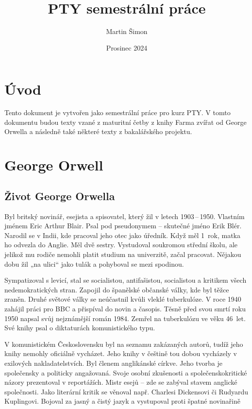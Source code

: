 \documentclass{article}
\title{PTY semestrální práce}
\author{Martin Šimon}
\date{Prosinec 2024}
\begin{document}
\maketitle


\tableofcontents
{} %
\setcounter{page}{2}

\clearpage

\section{Úvod}
Tento dokument je vytvořen jako semestrální práce pro kurz PTY. V tomto dokumentu budou texty vzané z 
maturitní četby z knihy Farma zvířat od George Orwella a následně také některé texty z bakalářského projektu.

\section{George Orwell}

\subsection{Život George Orwella}

Byl britský novinář, esejista a spisovatel, který žil v letech 1903\,--\,1950. Vlastním jménem Eric Arthur Blair. Psal pod pseudonymem – skutečné jméno Erik Blér. Narodil se v Indii, kde pracoval jeho otec jako úředník. Když měl 1~rok, matka ho odvezla do Anglie. Měl dvě sestry. Vystudoval soukromou střední školu, ale jelikož mu rodiče nemohli platit studium na univerzitě, začal pracovat. Nějakou dobu žil „na ulici“ jako tulák a pohyboval se mezi spodinou. 

Sympatizoval s levicí, stal se socialistou, antifašistou, socialistou a kritikem všech nedemokratických stran. 
Zapojil do španělské občanské války, kde byl těžce zraněn. Druhé světové války se neúčastnil kvůli vleklé 
tuberkulóze. V roce 1940 zahájil práci pro BBC a přispíval do novin a časopis. Těsně před svou smrtí roku 1950 
napsal svůj nejznámější román 1984. Zemřel na tuberkulózu ve věku 46~let. Své knihy psal o diktaturách 
komunistického typu. 

V komunistickém Československu byl na seznamu zakázaných autorů, tudíž jeho knihy nemohly oficiálně vycházet. 
Jeho knihy v češtině tou dobou vycházely v exilových nakladatelstvích. Byl členem anglikánské církve. Jeho 
tvorba je společensky a politicky angažovaná. Svoje osobní zkušenosti a společenskokritické názory prezentoval 
v reportážích. Mistr esejů – zde se zabýval stavem anglické společnosti. Jako literární kritik se věnoval 
např. Charlesi Dickensovi či Rudyardu Kuplingovi. Bojoval za jasný a čistý jazyk a vystupoval proti špatné 
novinařině
\end{document}
